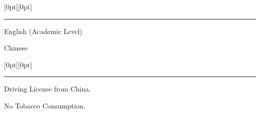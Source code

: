 \documentclass[letterpaper,12pt]{letter}
\begin{document}
\secb



\raisebox{0pt}[0pt][0pt]{\Large\textbf{\raisebox{-3.5ex}{Language Skill}}} 
\\[2mm]
\rule[-0.5cm]{10cm}{1pt}

% 

\begin{shortitemize}
\item \textrm{\normalsize English (Academic Level)}
\item \textrm{\normalsize Chinese}
\end{shortitemize}
\secb



\raisebox{0pt}[0pt][0pt]{\Large\textbf{\raisebox{-3.5ex}{Additional Information}}} 
\\[2mm]
\rule[-0.5cm]{10cm}{1pt}



\begin{shortitemize}
\item \textrm{\normalsize Driving License from China.}
\item \textrm{\normalsize No Tobacco Consumption.}
\end{shortitemize}


\end{document}
